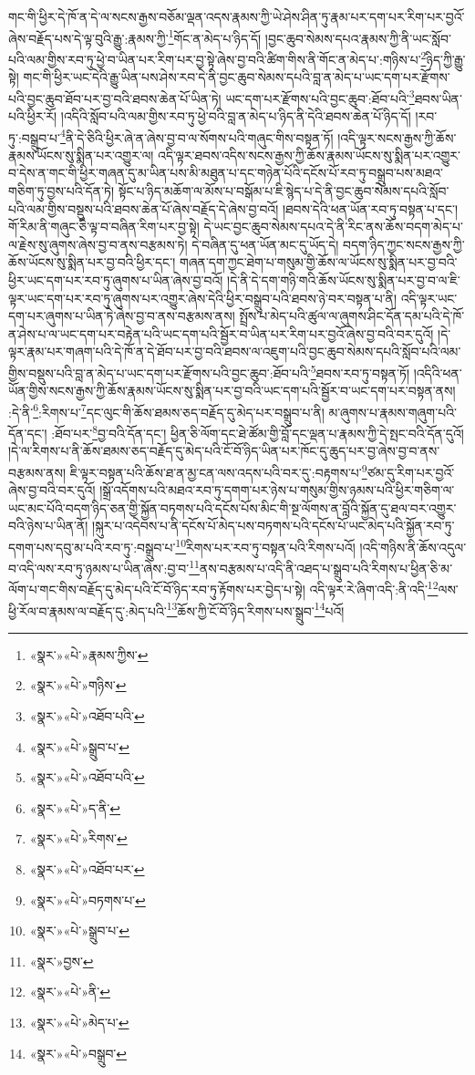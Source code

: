གང་གི་ཕྱིར་དེ་ཁོ་ན་དེ་ལ་སངས་རྒྱས་བཅོམ་ལྡན་འདས་རྣམས་ཀྱི་ཡེ་ཤེས་ཤིན་ཏུ་རྣམ་པར་དག་པར་རིག་པར་བྱའོ་ཞེས་བརྗོད་པས་དེ་ལྟ་བུའི་རྒྱུ་:རྣམས་ཀྱི་\footnote{«སྣར་»«པེ་»རྣམས་ཀྱིས་}གོང་ན་མེད་པ་ཉིད་དོ། །བྱང་ཆུབ་སེམས་དཔའ་རྣམས་ཀྱི་ནི་ཡང་སློབ་པའི་ལམ་གྱིས་རབ་ཏུ་ཕྱེ་བ་ཡིན་པར་རིག་པར་བྱ་སྟེ་ཞེས་བྱ་བའི་ཚིག་གིས་ནི་གོང་ན་མེད་པ་:གཉིས་པ་\footnote{«སྣར་»«པེ་»གཉིས་}ཉིད་ཀྱི་རྒྱུ་སྟེ། གང་གི་ཕྱིར་ཡང་དེའི་རྒྱུ་ཡིན་པས་ཤེས་རབ་དེ་ནི་བྱང་ཆུབ་སེམས་དཔའི་བླ་ན་མེད་པ་ཡང་དག་པར་རྫོགས་པའི་བྱང་ཆུབ་ཐོབ་པར་བྱ་བའི་ཐབས་ཆེན་པོ་ཡིན་ཏེ། ཡང་དག་པར་རྫོགས་པའི་བྱང་ཆུབ་:ཐོབ་པའི་\footnote{«སྣར་»«པེ་»འཐོབ་པའི་}ཐབས་ཡིན་པའི་ཕྱིར་རོ། །འདིའི་སློབ་པའི་ལམ་གྱིས་རབ་ཏུ་ཕྱེ་བའི་བླ་ན་མེད་པ་ཉིད་ནི་དེའི་ཐབས་ཆེན་པོ་ཉིད་དོ། །རབ་ཏུ་:བསྒྲུབ་པ་\footnote{«སྣར་»«པེ་»སྒྲུབ་པ་}ནི་དེ་ཅིའི་ཕྱིར་ཞེ་ན་ཞེས་བྱ་བ་ལ་སོགས་པའི་གཞུང་གིས་བསྟན་ཏོ། །འདི་ལྟར་སངས་རྒྱས་ཀྱི་ཆོས་རྣམས་ཡོངས་སུ་སྨིན་པར་འགྱུར་ལ། འདི་ལྟར་ཐབས་འདིས་སངས་རྒྱས་ཀྱི་ཆོས་རྣམས་ཡོངས་སུ་སྨིན་པར་འགྱུར་བ་དེས་ན་གང་གི་ཕྱིར་གཞན་དུ་མ་ཡིན་པས་མི་མཐུན་པ་དང་གཉེན་པོའི་དངོས་པོ་རབ་ཏུ་བསྒྲུབ་པས་མཐའ་གཅིག་ཏུ་བྱས་པའི་དོན་ཏེ། སྟོང་པ་ཉིད་མཆོག་ལ་མོས་པ་བསྒོམ་པ་ཇི་སྙེད་པ་དེ་ནི་བྱང་ཆུབ་སེམས་དཔའི་སློབ་པའི་ལམ་གྱིས་བསྡུས་པའི་ཐབས་ཆེན་པོ་ཞེས་བརྗོད་དེ་ཞེས་བྱ་བའོ། །ཐབས་དེའི་ཕན་ཡོན་རབ་ཏུ་བསྟན་པ་དང་། གོ་རིམ་ནི་གཞུང་ཅི་ལྟ་བ་བཞིན་རིག་པར་བྱ་སྟེ། དེ་ཡང་བྱང་ཆུབ་སེམས་དཔའ་དེ་ནི་རིང་ནས་ཆོས་བདག་མེད་པ་ལ་རྗེས་སུ་ཞུགས་ཞེས་བྱ་བ་ནས་བརྩམས་ཏེ། དེ་བཞིན་དུ་ཕན་ཡོན་མང་དུ་ཡོད་དེ། བདག་ཉིད་ཀྱང་སངས་རྒྱས་ཀྱི་ཆོས་ཡོངས་སུ་སྨིན་པར་བྱ་བའི་ཕྱིར་དང་། གཞན་དག་ཀྱང་ཐེག་པ་གསུམ་གྱི་ཆོས་ལ་ཡོངས་སུ་སྨིན་པར་བྱ་བའི་ཕྱིར་ཡང་དག་པར་རབ་ཏུ་ཞུགས་པ་ཡིན་ཞེས་བྱ་བའོ། །དེ་ནི་དེ་དག་གཉི་གའི་ཆོས་ཡོངས་སུ་སྨིན་པར་བྱ་བ་ལ་ཇི་ལྟར་ཡང་དག་པར་རབ་ཏུ་ཞུགས་པར་འགྱུར་ཞེས་དེའི་ཕྱིར་བསྒྲུབ་པའི་ཐབས་ཉེ་བར་བསྟན་པ་ནི། འདི་ལྟར་ཡང་དག་པར་ཞུགས་པ་ཡིན་ཏེ་ཞེས་བྱ་བ་ནས་བརྩམས་ནས། སྤྲོས་པ་མེད་པའི་ཚུལ་ལ་ཞུགས་ཤིང་དོན་དམ་པའི་དེ་ཁོ་ན་ཤེས་པ་ལ་ཡང་དག་པར་བརྟེན་པའི་ཡང་དག་པའི་སྦྱོར་བ་ཡིན་པར་རིག་པར་བྱའོ་ཞེས་བྱ་བའི་བར་དུའོ། །དེ་ལྟར་རྣམ་པར་གཞག་པའི་དེ་ཁོ་ན་དེ་ཐོབ་པར་བྱ་བའི་ཐབས་ལ་འཇུག་པའི་བྱང་ཆུབ་སེམས་དཔའི་སློབ་པའི་ལམ་གྱིས་བསྡུས་པའི་བླ་ན་མེད་པ་ཡང་དག་པར་རྫོགས་པའི་བྱང་ཆུབ་:ཐོབ་པའི་\footnote{«སྣར་»«པེ་»འཐོབ་པའི་}ཐབས་རབ་ཏུ་བསྟན་ཏོ། །འདིའི་ཕན་ཡོན་གྱིས་སངས་རྒྱས་ཀྱི་ཆོས་རྣམས་ཡོངས་སུ་སྨིན་པར་བྱ་བའི་ཡང་དག་པའི་སྦྱོར་བ་ཡང་དག་པར་བསྟན་ནས། :དེ་ནི་\footnote{«སྣར་»«པེ་»ད་ནི་}:རིགས་པ་\footnote{«སྣར་»«པེ་»རིགས་}དང་ལུང་གི་ཆོས་ཐམས་ཅད་བརྗོད་དུ་མེད་པར་བསྒྲུབ་པ་ནི། མ་ཞུགས་པ་རྣམས་གཞུག་པའི་དོན་དང་། :ཐོབ་པར་\footnote{«སྣར་»«པེ་»འཐོབ་པར་}བྱ་བའི་དོན་དང་། ཕྱིན་ཅི་ལོག་དང་ཐེ་ཚོམ་གྱི་བློ་དང་ལྡན་པ་རྣམས་ཀྱི་དེ་སྤང་བའི་དོན་དུའོ། །དེ་ལ་རིགས་པ་ནི་ཆོས་ཐམས་ཅད་བརྗོད་དུ་མེད་པའི་ངོ་བོ་ཉིད་ཡིན་པར་ཁོང་དུ་ཆུད་པར་བྱ་ཞེས་བྱ་བ་ནས་བརྩམས་ནས། ཇི་ལྟར་བསྟན་པའི་ཆོས་ཐ་ན་མྱ་ངན་ལས་འདས་པའི་བར་དུ་:བརྟགས་པ་\footnote{«སྣར་»«པེ་»བཏགས་པ་}ཙམ་དུ་རིག་པར་བྱའོ་ཞེས་བྱ་བའི་བར་དུའོ། །སྒྲོ་འདོགས་པའི་མཐའ་རབ་ཏུ་དགག་པར་ཉེས་པ་གསུམ་གྱིས་ཉམས་པའི་ཕྱིར་གཅིག་ལ་ཡང་མང་པོའི་བདག་ཉིད་ཅན་གྱི་སྐྱོན་བཏགས་པའི་དངོས་པོས་མིང་གི་སྔ་ལོགས་ན་བློའི་སྐྱོན་དུ་ཐལ་བར་འགྱུར་བའི་ཉེས་པ་ཡིན་ནོ། །སྐུར་པ་འདེབས་པ་ནི་དངོས་པོ་མེད་པས་བཏགས་པའི་དངོས་པོ་ཡང་མེད་པའི་སྐྱོན་རབ་ཏུ་དགག་པས་དབུ་མ་པའི་རབ་ཏུ་:བསྒྲུབ་པ་\footnote{«སྣར་»«པེ་»སྒྲུབ་པ་}རིགས་པར་རབ་ཏུ་བསྟན་པའི་རིགས་པའོ། །འདི་གཉིས་ནི་ཆོས་འདུལ་བ་འདི་ལས་རབ་ཏུ་ཉམས་པ་ཡིན་ཞེས་:བྱ་བ་\footnote{«སྣར་»བྱས་}ནས་བརྩམས་པ་འདི་ནི་འཐད་པ་སྒྲུབ་པའི་རིགས་པ་ཕྱིན་ཅི་མ་ལོག་པ་གང་གིས་བརྗོད་དུ་མེད་པའི་ངོ་བོ་ཉིད་རབ་ཏུ་རྟོགས་པར་བྱེད་པ་སྟེ། འདི་ལྟར་རེ་ཞིག་འདི་:ནི་འདི་\footnote{«སྣར་»«པེ་»ནི་}ལས་ཕྱི་རོལ་བ་རྣམས་ལ་བརྗོད་དུ་:མེད་པའི་\footnote{«སྣར་»«པེ་»མེད་པ་}ཆོས་ཀྱི་ངོ་བོ་ཉིད་རིགས་པས་སྒྲུབ་\footnote{«སྣར་»«པེ་»བསྒྲུབ་}པའོ། 